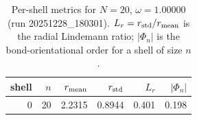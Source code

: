 \begin{table}[t]
\centering
\small
\setlength{\tabcolsep}{4pt}
\renewcommand{\arraystretch}{1.15}
\begin{tabular}{r r r r r r}
\toprule
shell & $n$ & $r_{\rm mean}$ & $r_{\rm std}$ & $L_r$ & $|\Phi_n|$ \\
\midrule
0 & 20 & 2.2315 & 0.8944 & 0.401 & 0.198 \\
\bottomrule
\end{tabular}
\caption{Per-shell metrics for $N=20$, $\omega=1.00000$ (run 20251228_180301). $L_r=r_{\rm std}/r_{\rm mean}$ is the radial Lindemann ratio; $|\Phi_n|$ is the bond-orientational order for a shell of size $n$.}
\end{table}